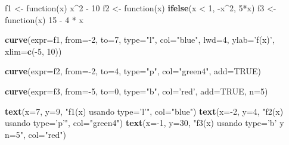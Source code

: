 \documentclass[10pt,]{krantz}
\makeatletter
\newenvironment{Shaded}{\begin{snugshade}}{\end{snugshade}}
\newcommand{\KeywordTok}[1]{\textcolor[rgb]{0.13,0.29,0.53}{\textbf{{#1}}}}
\newcommand{\DataTypeTok}[1]{\textcolor[rgb]{0.13,0.29,0.53}{{#1}}}
\newcommand{\DecValTok}[1]{\textcolor[rgb]{0.00,0.00,0.81}{{#1}}}
\newcommand{\StringTok}[1]{\textcolor[rgb]{0.31,0.60,0.02}{{#1}}}
\newcommand{\OtherTok}[1]{\textcolor[rgb]{0.56,0.35,0.01}{{#1}}}
\newcommand{\NormalTok}[1]{{#1}}
\newenvironment{kframe}{%
\medskip{}
\setlength{\fboxsep}{.8em}
 \def\at@end@of@kframe{}%
 \ifinner\ifhmode%
  \def\at@end@of@kframe{\end{minipage}}%
  \begin{minipage}{\columnwidth}%
 \fi\fi%
 \def\FrameCommand##1{\hskip\@totalleftmargin \hskip-\fboxsep
 \colorbox{shadecolor}{##1}\hskip-\fboxsep
     \hskip-\linewidth \hskip-\@totalleftmargin \hskip\columnwidth}%
 \MakeFramed {\advance\hsize-\width
   \@totalleftmargin\z@ \linewidth\hsize
   \@setminipage}}%
 {\par\unskip\endMakeFramed%
 \at@end@of@kframe}
\renewenvironment{Shaded}{\begin{kframe}}{\end{kframe}}
\makeatother
\begin{document}
\begin{Shaded}
\begin{Highlighting}[]
\NormalTok{f1 <-}\StringTok{ }\NormalTok{function(x) x^}\DecValTok{2} \NormalTok{-}\StringTok{ }\DecValTok{10}
\NormalTok{f2 <-}\StringTok{ }\NormalTok{function(x) }\KeywordTok{ifelse}\NormalTok{(x <}\StringTok{ }\DecValTok{1}\NormalTok{, -x^}\DecValTok{2}\NormalTok{, }\DecValTok{5}\NormalTok{*x)}
\NormalTok{f3 <-}\StringTok{ }\NormalTok{function(x) }\DecValTok{15} \NormalTok{-}\StringTok{ }\DecValTok{4} \NormalTok{*}\StringTok{ }\NormalTok{x}

\KeywordTok{curve}\NormalTok{(}\DataTypeTok{expr=}\NormalTok{f1, }\DataTypeTok{from=}\NormalTok{-}\DecValTok{2}\NormalTok{, }\DataTypeTok{to=}\DecValTok{7}\NormalTok{, }\DataTypeTok{type=}\StringTok{"l"}\NormalTok{,}
      \DataTypeTok{col=}\StringTok{"blue"}\NormalTok{, }\DataTypeTok{lwd=}\DecValTok{4}\NormalTok{, }\DataTypeTok{ylab=}\StringTok{'f(x)'}\NormalTok{, }\DataTypeTok{xlim=}\KeywordTok{c}\NormalTok{(-}\DecValTok{5}\NormalTok{, }\DecValTok{10}\NormalTok{))}

\KeywordTok{curve}\NormalTok{(}\DataTypeTok{expr=}\NormalTok{f2, }\DataTypeTok{from=}\NormalTok{-}\DecValTok{2}\NormalTok{, }\DataTypeTok{to=}\DecValTok{4}\NormalTok{, }\DataTypeTok{type=}\StringTok{"p"}\NormalTok{,}
      \DataTypeTok{col=}\StringTok{"green4"}\NormalTok{, }\DataTypeTok{add=}\OtherTok{TRUE}\NormalTok{)}

\KeywordTok{curve}\NormalTok{(}\DataTypeTok{expr=}\NormalTok{f3, }\DataTypeTok{from=}\NormalTok{-}\DecValTok{5}\NormalTok{, }\DataTypeTok{to=}\DecValTok{0}\NormalTok{, }\DataTypeTok{type=}\StringTok{"b"}\NormalTok{,}
      \DataTypeTok{col=}\StringTok{'red'}\NormalTok{, }\DataTypeTok{add=}\OtherTok{TRUE}\NormalTok{, }\DataTypeTok{n=}\DecValTok{5}\NormalTok{)}

\KeywordTok{text}\NormalTok{(}\DataTypeTok{x=}\DecValTok{7}\NormalTok{, }\DataTypeTok{y=}\DecValTok{9}\NormalTok{, }\StringTok{"f1(x) usando type='l'"}\NormalTok{, }\DataTypeTok{col=}\StringTok{"blue"}\NormalTok{)}
\KeywordTok{text}\NormalTok{(}\DataTypeTok{x=}\NormalTok{-}\DecValTok{2}\NormalTok{, }\DataTypeTok{y=}\DecValTok{4}\NormalTok{, }\StringTok{"f2(x) usando type='p'"}\NormalTok{, }\DataTypeTok{col=}\StringTok{"green4"}\NormalTok{)}
\KeywordTok{text}\NormalTok{(}\DataTypeTok{x=}\NormalTok{-}\DecValTok{1}\NormalTok{, }\DataTypeTok{y=}\DecValTok{30}\NormalTok{, }\StringTok{"f3(x) usando type='b' y n=5"}\NormalTok{, }\DataTypeTok{col=}\StringTok{"red"}\NormalTok{)}
\end{Highlighting}
\end{Shaded}
\end{document}
